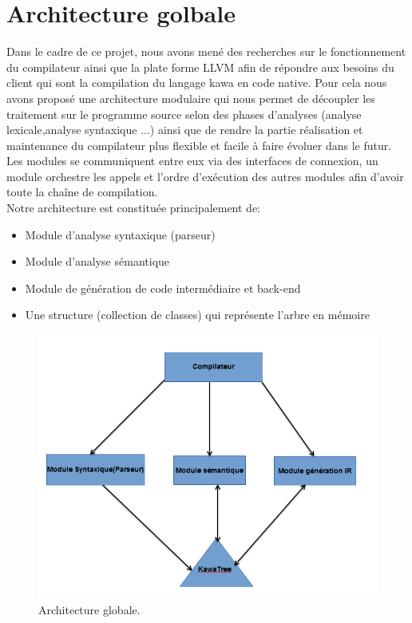 \documentclass{../res/univ-projet}
\begin{document}
\maketitle
\newpage
\tableofcontents
\newpage

\section{Architecture golbale}

Dans le cadre de ce projet, nous avons mené des recherches sur le fonctionnement du compilateur ainsi que la plate forme LLVM afin de répondre aux besoins du client qui sont la compilation du langage kawa en code native.
Pour cela nous avons proposé une architecture modulaire qui nous permet de découpler les traitement sur le programme source selon des phases d'analyses (analyse lexicale,analyse syntaxique ...) ainsi que de rendre la partie réalisation et maintenance du compilateur plus flexible et facile à faire évoluer dans le futur.\\
Les modules se communiquent entre eux via des interfaces de connexion, un module orchestre les appels et l'ordre d’exécution des autres modules afin d'avoir toute la chaîne de compilation.\\

Notre architecture est constituée principalement de: 

 \begin{itemize}
 	\item	Module d'analyse syntaxique (parseur)
	\item   Module d'analyse sémantique
	\item   Module de génération de code intermédiaire et back-end
	\item   Une structure (collection de classes) qui représente l'arbre en mémoire
 \end{itemize}

\begin{figure}[h!]
\centering
\includegraphics[scale=0.80]{archi.PNG}
\caption[Architecture globale.]{Architecture globale.}
\end{figure}
\end{document}
